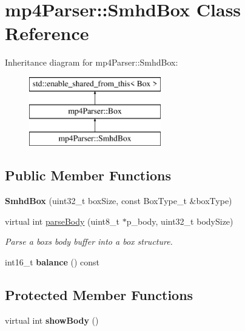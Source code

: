 \hypertarget{classmp4_parser_1_1_smhd_box}{}\section{mp4\+Parser\+::Smhd\+Box Class Reference}
\label{classmp4_parser_1_1_smhd_box}
Inheritance diagram for mp4\+Parser\+::Smhd\+Box\+:\begin{figure}[H]
\begin{center}
\leavevmode
\includegraphics[height=3.000000cm]{classmp4_parser_1_1_smhd_box}
\end{center}
\end{figure}
\subsection*{Public Member Functions}
\begin{DoxyCompactItemize}
\item 
\mbox{\label{classmp4_parser_1_1_smhd_box_a00543725f048ec737dcce2537b852029}} 
{\bfseries Smhd\+Box} (uint32\+\_\+t box\+Size, const Box\+Type\+\_\+t \&box\+Type)
\item 
virtual int \mbox{\hyperlink{classmp4_parser_1_1_smhd_box_a82ee0a15370b6fafad0dcef1081f9fd9}{parse\+Body}} (uint8\+\_\+t $\ast$p\+\_\+body, uint32\+\_\+t body\+Size)
\begin{DoxyCompactList}\small\item\em Parse a box\textquotesingle{}s body buffer into a box structure. \end{DoxyCompactList}\item 
\mbox{\label{classmp4_parser_1_1_smhd_box_a4ab4933d1dfeb0d8a6603fed28dd8bbd}} 
int16\+\_\+t {\bfseries balance} () const
\end{DoxyCompactItemize}
\subsection*{Protected Member Functions}
\begin{DoxyCompactItemize}
\item 
\mbox{\label{classmp4_parser_1_1_smhd_box_a91a32b9d69bf85d4552c8f24bb3044c4}} 
virtual int {\bfseries show\+Body} ()
\end{DoxyCompactItemize}
